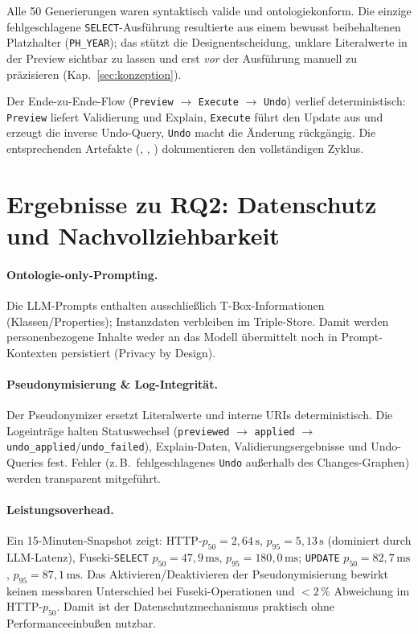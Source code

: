Alle 50 Generierungen waren syntaktisch valide und ontologiekonform. Die einzige fehlgeschlagene \texttt{SELECT}-Ausführung resultierte aus einem bewusst beibehaltenen Platzhalter (\texttt{PH\_YEAR}); das stützt die Designentscheidung, unklare Literalwerte in der Preview sichtbar zu lassen und erst \emph{vor} der Ausführung manuell zu präzisieren (Kap.~\ref{sec:konzeption}).

Der Ende-zu-Ende-Flow (\texttt{Preview} $\rightarrow$ \texttt{Execute} $\rightarrow$ \texttt{Undo}) verlief deterministisch: \texttt{Preview} liefert Validierung und Explain, \texttt{Execute} führt den Update aus und erzeugt die inverse Undo-Query, \texttt{Undo} macht die Änderung rückgängig. Die entsprechenden Artefakte (, , ) dokumentieren den vollständigen Zyklus.

\section{Ergebnisse zu RQ2: Datenschutz und Nachvollziehbarkeit}
\label{sec:ergebnisse-rq2}

\paragraph{Ontologie-only-Prompting.}
Die LLM-Prompts enthalten ausschließlich T-Box-Informationen (Klassen/Properties); Instanzdaten verbleiben im Triple-Store. Damit werden personenbezogene Inhalte weder an das Modell übermittelt noch in Prompt-Kontexten persistiert (Privacy by Design).

\paragraph{Pseudonymisierung \& Log-Integrität.}
Der Pseudonymizer ersetzt Literalwerte und interne URIs deterministisch. Die Logeinträge halten Statuswechsel (\texttt{previewed} \(\rightarrow\) \texttt{applied} \(\rightarrow\) \texttt{undo\_applied}/\texttt{undo\_failed}), Explain-Daten, Validierungsergebnisse und Undo-Queries fest. Fehler (z.\,B.\ fehlgeschlagenes \texttt{Undo} außerhalb des Changes-Graphen) werden transparent mitgeführt.

\paragraph{Leistungsoverhead.}
Ein 15-Minuten-Snapshot zeigt: HTTP-\(p_{50}=2{,}64\,\mathrm{s}\), \(p_{95}=5{,}13\,\mathrm{s}\) (dominiert durch LLM-Latenz), Fuseki-\texttt{SELECT} \(p_{50}=47{,}9\,\mathrm{ms}\), \(p_{95}=180{,}0\,\mathrm{ms}\); \texttt{UPDATE} \(p_{50}=82{,}7\,\mathrm{ms}\), \(p_{95}=87{,}1\,\mathrm{ms}\). Das Aktivieren/Deaktivieren der Pseudonymisierung bewirkt keinen messbaren Unterschied bei Fuseki-Operationen und $<2\,\%$ Abweichung im HTTP-\(p_{50}\). Damit ist der Datenschutzmechanismus praktisch ohne Performanceeinbußen nutzbar.

